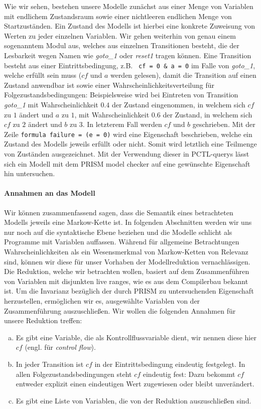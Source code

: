 \documentclass[a4paper]{article}
\newcommand{\mc}{Markow-Kette}
\newcommand{\mcpl}{Markow-Ketten}
\theoremstyle{nonumberplain}
\begin{document}
Wie wir sehen, bestehen unsere Modelle zunächst aus einer Menge von Variablen mit endlichem Zustandsraum sowie einer nichtleeren endlichen Menge von Startzuständen.
Ein Zustand des Modells ist hierbei eine konkrete Zuweisung von Werten zu jeder einzelnen Variablen.
Wir gehen weiterhin von genau einem sogenanntem Modul aus, welches aus einzelnen Transitionen besteht, die der Lesbarkeit wegen Namen wie \textit{goto\_1} oder \textit{reset1} tragen können.
Eine Transition besteht aus einer Eintrittsbedingung, z.B. \texttt{ cf = 0 \& a = 0} im Falle von \textit{goto\_1}, welche erfüllt sein muss ($cf$ und $a$ werden gelesen), damit die Transition auf einen Zustand anwendbar ist sowie einer Wahrscheinlichkeitsverteilung für Folgezustandsbedingungen:
Beispielsweise wird bei Eintreten von Transition \textit{goto\_1} mit Wahrscheinlichkeit $0.4$ der Zustand eingenommen, in welchem sich $cf$ zu $1$ ändert und $a$ zu $1$, mit Wahrscheinlichkeit $0.6$ der Zustand, in welchem sich $cf$ zu $2$ ändert und $b$ zu $3$. In letzterem Fall werden $cf$ und $b$ geschrieben.
Mit der Zeile \texttt{formula failure = (e = 0)} wird eine Eigenschaft beschrieben, welche ein Zustand des Modells jeweils erfüllt oder nicht. Somit wird letztlich eine Teilmenge von Zuständen ausgezeichnet. Mit der Verwendung dieser in PCTL-querys lässt sich ein Modell mit dem PRISM model checker auf eine gewünschte Eigenschaft hin untersuchen.

\paragraph{Annahmen an das Modell}


Wir können zusammenfassend sagen, dass die Semantik eines betrachteten Modells jeweils eine \mc{} ist.
In folgenden Abschnitten werden wir uns nur noch auf die syntaktische Ebene beziehen und die Modelle schlicht als Programme mit Variablen auffassen.
Während für allgemeine Betrachtungen Wahrscheinlichkeiten als ein Wesensmerkmal von \mcpl{} von Relevanz sind, können wir diese für unser Vorhaben der Modellreduktion vernachlässigen.
Die Reduktion, welche wir betrachten wollen, basiert auf dem Zusammenführen von Variablen mit disjunkten live ranges, wie es aus dem Compilerbau bekannt ist.
Um die Invarianz bezüglich der durch PRISM zu untersuchenden Eigenschaft herzustellen, ermöglichen wir es, ausgewählte Variablen von der Zusammenführung auszuschließen. Wir wollen die folgenden Annahmen für unsere Reduktion treffen:

\begin{enumerate}[(a)]
	\item Es gibt eine Variable, die als Kontrollflussvariable dient, wir nennen diese hier $cf$ (engl. für \textit{control flow}).
	\item In jeder Transition ist $cf$ in der Eintrittsbedingung eindeutig festgelegt. In allen Folgezustandsbedingungen steht $cf$ eindeutig fest: Dazu bekommt $cf$ entweder explizit einen eindeutigen Wert zugewiesen oder bleibt unverändert.
	\item Es gibt eine Liste von Variablen, die von der Reduktion auszuschließen sind.
\end{enumerate}
\end{document}
